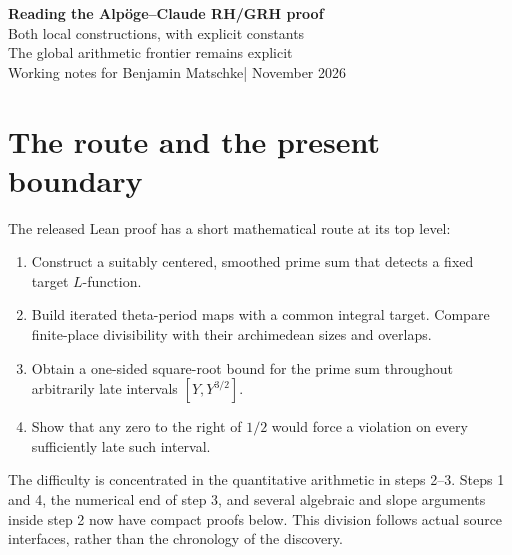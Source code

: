 \documentclass[11pt,a4paper]{article}
\numberwithin{equation}{section}
\theoremstyle{remark}\newtheorem{remark}[theorem]{Remark}
\begin{document}
\begin{center}
{\LARGE\bfseries Reading the Alp\"oge--Claude RH/GRH proof}\\[7pt]
{\large Both local constructions, with explicit constants}\\[-1pt]
{\large The global arithmetic frontier remains explicit}\\[8pt]
Working notes for Benjamin Matschke\quad | November 2026
\end{center}

\begingroup\setlength{\fboxsep}{9pt}
\noindent{}\endgroup

\section{The route and the present boundary}

The released Lean proof has a short mathematical route at its top level:
\begin{enumerate}
\item Construct a suitably centered, smoothed prime sum that detects a fixed target $L$-function.
\item Build iterated theta-period maps with a common integral target. Compare finite-place divisibility with their archimedean sizes and overlaps.
\item Obtain a one-sided square-root bound for the prime sum throughout arbitrarily late intervals $[Y,Y^{3/2}]$.
\item Show that any zero to the right of $1/2$ would force a violation on every sufficiently late such interval.
\end{enumerate}
The difficulty is concentrated in the quantitative arithmetic in steps 2--3. Steps 1 and 4, the numerical end of step 3, and several algebraic and slope arguments inside step 2 now have compact proofs below. This division follows actual source interfaces, rather than the chronology of the discovery.
\end{document}
